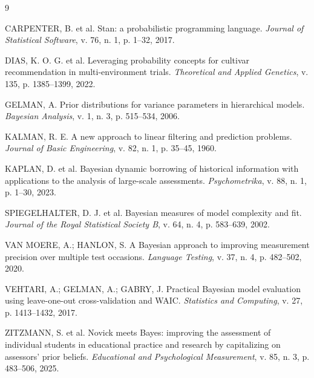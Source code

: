 \documentclass[11pt,a4paper]{article}
\begin{document}
\begin{thebibliography}{9}
\setlength{\itemsep}{0pt}
\small

CARPENTER, B. et al. Stan: a probabilistic programming language.
\textit{Journal of Statistical Software}, v. 76, n. 1, p. 1--32, 2017.

DIAS, K. O. G. et al. Leveraging probability concepts for cultivar recommendation in
multi-environment trials. \textit{Theoretical and Applied Genetics}, v. 135,
p. 1385--1399, 2022.

GELMAN, A. Prior distributions for variance parameters in hierarchical models.
\textit{Bayesian Analysis}, v. 1, n. 3, p. 515--534, 2006.

KALMAN, R. E. A new approach to linear filtering and prediction problems.
\textit{Journal of Basic Engineering}, v. 82, n. 1, p. 35--45, 1960.

KAPLAN, D. et al. Bayesian dynamic borrowing of historical information with applications to
the analysis of large-scale assessments. \textit{Psychometrika}, v. 88, n. 1, p. 1--30, 2023.

SPIEGELHALTER, D. J. et al. Bayesian measures of model complexity and fit.
\textit{Journal of the Royal Statistical Society B}, v. 64, n. 4, p. 583--639, 2002.

VAN MOERE, A.; HANLON, S. A Bayesian approach to improving measurement precision over
multiple test occasions. \textit{Language Testing}, v. 37, n. 4, p. 482--502, 2020.

VEHTARI, A.; GELMAN, A.; GABRY, J. Practical Bayesian model evaluation using
leave-one-out cross-validation and WAIC. \textit{Statistics and Computing}, v. 27,
p. 1413--1432, 2017.

ZITZMANN, S. et al. Novick meets Bayes: improving the assessment of individual students in
educational practice and research by capitalizing on assessors' prior beliefs.
\textit{Educational and Psychological Measurement}, v. 85, n. 3, p. 483--506, 2025.

\end{thebibliography}
\end{document}

